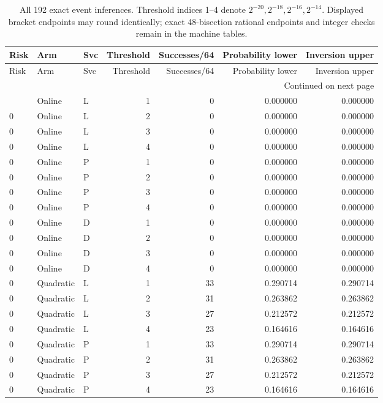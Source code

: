 \begingroup
\scriptsize
\setlength{\tabcolsep}{3pt}
\begin{longtable}{lllrrrr}
\caption{All 192 exact event inferences. Threshold indices 1--4 denote $2^{-20},2^{-18},2^{-16},2^{-14}$. Displayed bracket endpoints may round identically; exact 48-bisection rational endpoints and integer checks remain in the machine tables.}\label{tab:allevents120}\\
\toprule
Risk & Arm & Svc & Threshold & Successes/64 & Probability lower & Inversion upper \\ \midrule
\endfirsthead
\toprule
Risk & Arm & Svc & Threshold & Successes/64 & Probability lower & Inversion upper \\ \midrule
\endhead
\midrule\multicolumn{7}{r}{Continued on next page}\\\endfoot
\bottomrule\endlastfoot
0 & Online & L & 1 & 0 & 0.000000 & 0.000000 \\
0 & Online & L & 2 & 0 & 0.000000 & 0.000000 \\
0 & Online & L & 3 & 0 & 0.000000 & 0.000000 \\
0 & Online & L & 4 & 0 & 0.000000 & 0.000000 \\
0 & Online & P & 1 & 0 & 0.000000 & 0.000000 \\
0 & Online & P & 2 & 0 & 0.000000 & 0.000000 \\
0 & Online & P & 3 & 0 & 0.000000 & 0.000000 \\
0 & Online & P & 4 & 0 & 0.000000 & 0.000000 \\
0 & Online & D & 1 & 0 & 0.000000 & 0.000000 \\
0 & Online & D & 2 & 0 & 0.000000 & 0.000000 \\
0 & Online & D & 3 & 0 & 0.000000 & 0.000000 \\
0 & Online & D & 4 & 0 & 0.000000 & 0.000000 \\
0 & Quadratic & L & 1 & 33 & 0.290714 & 0.290714 \\
0 & Quadratic & L & 2 & 31 & 0.263862 & 0.263862 \\
0 & Quadratic & L & 3 & 27 & 0.212572 & 0.212572 \\
0 & Quadratic & L & 4 & 23 & 0.164616 & 0.164616 \\
0 & Quadratic & P & 1 & 33 & 0.290714 & 0.290714 \\
0 & Quadratic & P & 2 & 31 & 0.263862 & 0.263862 \\
0 & Quadratic & P & 3 & 27 & 0.212572 & 0.212572 \\
0 & Quadratic & P & 4 & 23 & 0.164616 & 0.164616 \\

\end{longtable}
